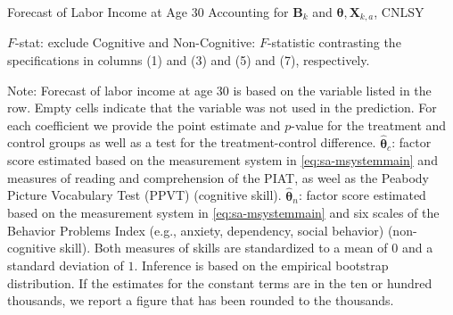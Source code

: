 \begin{table}
\begin{threeparttable}
\caption{Forecast of Labor Income at Age 30 Accounting for $\bm{B}_k$ and $\bm{\theta}, \bm{X}_{k,a}$, CNLSY}
\centering
\footnotesize

\begin{tablenotes}
\footnotesize
\item $F$-stat: exclude Cognitive and Non-Cognitive: $F$-statistic contrasting the specifications in columns (1) and (3) and (5) and (7), respectively.\\
\item Note: Forecast of labor income at age 30 is based on the variable listed in the row. Empty cells indicate that the variable was not used in the prediction. For each coefficient we provide the point estimate and $p$-value for the treatment and control groups as well as a test for the treatment-control difference. $\hat{\bm{\theta}}_{c}$: factor score estimated based on the measurement system in \eqref{eq:sa-msystemmain} and measures of reading and comprehension of the PIAT, as weel as the Peabody Picture Vocabulary Test (PPVT) (cognitive skill). $\hat{\bm{\theta}}_{n}$: factor score estimated based on the measurement system in \eqref{eq:sa-msystemmain} and six scales of the Behavior Problems Index (e.g., anxiety, dependency, social behavior) (non-cognitive skill). Both measures of skills are standardized to a mean of $0$ and a standard deviation of $1$. Inference is based on the empirical bootstrap distribution. If the estimates for the constant terms are in the ten or hundred thousands, we report a figure that has been rounded to the thousands.
\end{tablenotes}
\end{threeparttable}
\end{table}

